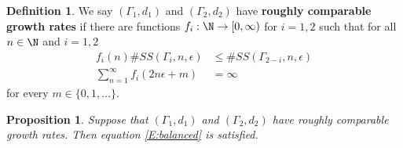 \documentclass[12pt]{article}
\theoremstyle{plain}
\newtheorem{prop}[thm]{Proposition}
\newtheorem{lem}[thm]{Lemma}
\theoremstyle{definition}
\newtheorem{defn}{Definition}
\theoremstyle{remark}
\newcommand{\G}{\Gamma}
\newcommand{\eps}{\epsilon}
\begin{document}
\begin{defn}
We  say $(\G_1,d_1)$ and $(\G_2,d_2)$ have {\bf roughly comparable growth rates} if there are functions $f_i:\N \to [0,\infty)$ for $i=1,2$ such that for all $n\in \N$ and $i=1,2$
\begin{align*}
    f_i(n) \#SS(\G_i,n,\eps)&\le \#SS(\G_{2-i},n,\eps) \\
    \sum_{n=1}^\infty f_i(2n\eps+m) &=\infty
\end{align*}
for every $m\in \{0,1,\ldots\}$. 

\end{defn}








\begin{prop}\label{P:roughly-comparable}
Suppose that $(\G_1,d_1)$ and $(\G_2,d_2)$ have roughly comparable growth rates.
Then equation \eqref{E:balanced} is satisfied. %
\end{prop}
\end{document}
